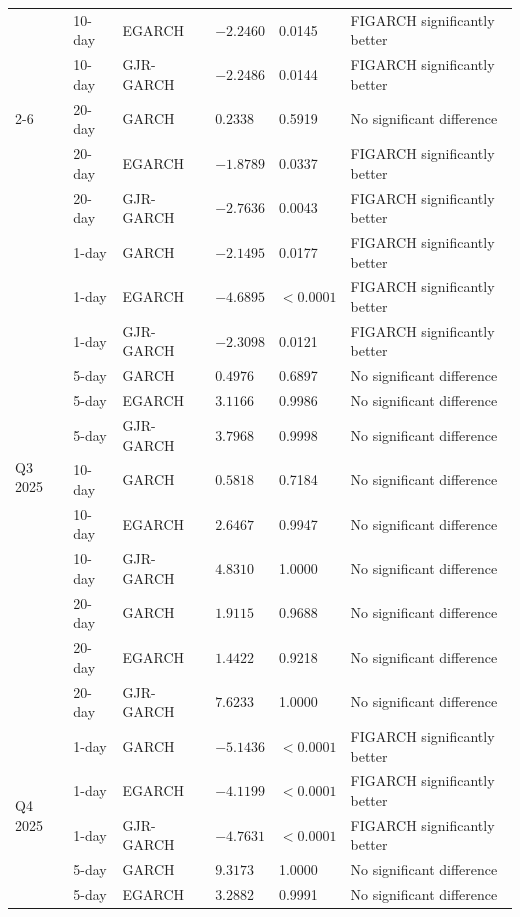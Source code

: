 \begin{table}[H]
{\begin{tabular}{|l|l|l|l|l|l|}
 & 10-day & EGARCH    & $-2.2460$ & 0.0145 & FIGARCH significantly better \\
 & 10-day & GJR-GARCH & $-2.2486$ & 0.0144 & FIGARCH significantly better \\
\cline{2-6}
 & 20-day & GARCH     & $0.2338$  & 0.5919 & No significant difference \\
 & 20-day & EGARCH    & $-1.8789$ & 0.0337 & FIGARCH significantly better \\
 & 20-day & GJR-GARCH & $-2.7636$ & 0.0043 & FIGARCH significantly better \\
\hline
\multirow{12}{*}{Q3 2025}
 & 1-day  & GARCH     & $-2.1495$ & 0.0177 & FIGARCH significantly better \\
 & 1-day  & EGARCH    & $-4.6895$ & $<0.0001$ & FIGARCH significantly better \\
 & 1-day  & GJR-GARCH & $-2.3098$ & 0.0121 & FIGARCH significantly better \\
\cline{2-6}
 & 5-day  & GARCH     & $0.4976$  & 0.6897 & No significant difference \\
 & 5-day  & EGARCH    & $3.1166$  & 0.9986 & No significant difference \\
 & 5-day  & GJR-GARCH & $3.7968$  & 0.9998 & No significant difference \\
\cline{2-6}
 & 10-day & GARCH     & $0.5818$  & 0.7184 & No significant difference \\
 & 10-day & EGARCH    & $2.6467$  & 0.9947 & No significant difference \\
 & 10-day & GJR-GARCH & $4.8310$  & 1.0000 & No significant difference \\
\cline{2-6}
 & 20-day & GARCH     & $1.9115$  & 0.9688 & No significant difference \\
 & 20-day & EGARCH    & $1.4422$  & 0.9218 & No significant difference \\
 & 20-day & GJR-GARCH & $7.6233$  & 1.0000 & No significant difference \\
\hline
\multirow{12}{*}{Q4 2025}
 & 1-day  & GARCH     & $-5.1436$ & $<0.0001$ & FIGARCH significantly better \\
 & 1-day  & EGARCH    & $-4.1199$ & $<0.0001$ & FIGARCH significantly better \\
 & 1-day  & GJR-GARCH & $-4.7631$ & $<0.0001$ & FIGARCH significantly better \\
\cline{2-6}
 & 5-day  & GARCH     & $9.3173$  & 1.0000 & No significant difference \\
 & 5-day  & EGARCH    & $3.2882$  & 0.9991 & No significant difference \\

\end{tabular}}
\end{table}
